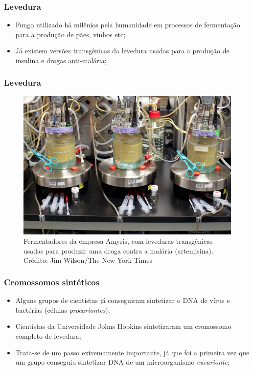 \documentclass{beamer}
\begin{document}
\begin{frame}
\frametitle{Levedura}
\begin{itemize}
\item Fungo utilizado há milênios pela humanidade em processos de fermentação para a produção de pães, vinhos etc;
\item Já existem versões transgênicas da levedura usadas para a produção de insulina e drogas anti-malária;
\end{itemize}
\end{frame}

\begin{frame}
\frametitle{Levedura}
\begin{figure}
\includegraphics[scale=0.9]{Fermenters.jpg}
\caption{Fermentadores da empresa Amyris, com leveduras transgênicas usadas para produzir uma droga contra a malária (artemisina). Crédito: Jim Wilson/The New York Times}
\end{figure}
\end{frame}

\begin{frame}
\frametitle{Cromossomos sintéticos}
\begin{itemize}
\item Alguns grupos de cientistas já conseguiram sintetizar o DNA de vírus e bactérias (células \emph{procariontes});
\item Cientistas da Universidade Johns Hopkins sintetizaram um cromossomo completo de levedura;
\item Trata-se de um passo extremamente importante, já que foi a primeira vez que um grupo conseguiu sintetizar DNA de um microorganismo \emph{eucarionte};
\end{itemize}
\end{frame}
\end{document}
